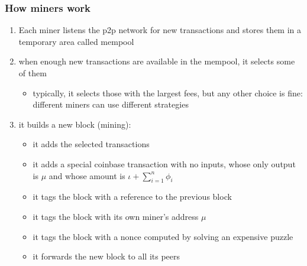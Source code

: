 \documentclass[11pt]{beamer}  %
\begin{document}
\begin{frame}\frametitle{How miners work}

  \begin{enumerate}
    \item Each miner listens the p2p network for new transactions and stores them in a
      temporary area called mempool
    \item when enough new transactions are available in the mempool, it selects some of them
      \begin{itemize}
      \item typically, it selects those with the largest fees, but any other choice is fine: different miners can use different strategies
      \end{itemize}
    \item it builds a new block (\alert{mining}):
      \begin{itemize}
      \item it adds the selected transactions
      \item it adds a special \alert{coinbase transaction} with no inputs, whose only output is $\mu$
        and whose amount is $\iota+\sum_{i=1}^n\phi_i$
      \item it tags the block with a reference to the previous block
      \item it tags the block with its own miner's address $\mu$
      \item it tags the block with a nonce computed by solving an expensive puzzle
      \item it forwards the new block to all its peers
      \end{itemize}
  \end{enumerate}
\end{frame}
\end{document}
